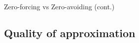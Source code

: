 \begin{frame}{Zero-forcing vs Zero-avoiding (cont.)}
\begin{figure}[t]
\end{figure}

\end{frame}

\subsection{Quality of approximation}

